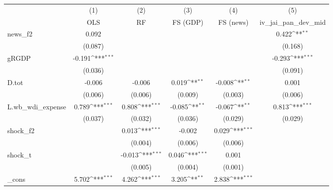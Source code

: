 {
\def\sym#1{\ifmmode^{#1}\else\(^{#1}\)\fi}
\begin{tabular}{l*{5}{c}}
\toprule
            &\multicolumn{1}{c}{(1)}&\multicolumn{1}{c}{(2)}&\multicolumn{1}{c}{(3)}&\multicolumn{1}{c}{(4)}&\multicolumn{1}{c}{(5)}\\
            &\multicolumn{1}{c}{OLS}&\multicolumn{1}{c}{RF}&\multicolumn{1}{c}{FS (GDP)}&\multicolumn{1}{c}{FS (news)}&\multicolumn{1}{c}{iv\_jai\_pan\_dev\_mid}\\
\midrule
news\_f2     &       0.092         &                     &                     &                     &       0.422\sym{**} \\
            &     (0.087)         &                     &                     &                     &     (0.168)         \\
\addlinespace
gRGDP       &      -0.191\sym{***}&                     &                     &                     &      -0.293\sym{***}\\
            &     (0.036)         &                     &                     &                     &     (0.091)         \\
\addlinespace
D.tot       &      -0.006         &      -0.006         &       0.019\sym{**} &      -0.008\sym{**} &       0.001         \\
            &     (0.006)         &     (0.006)         &     (0.009)         &     (0.003)         &     (0.006)         \\
\addlinespace
L.wb\_wdi\_expense&       0.789\sym{***}&       0.808\sym{***}&      -0.085\sym{**} &      -0.067\sym{**} &       0.813\sym{***}\\
            &     (0.037)         &     (0.032)         &     (0.036)         &     (0.029)         &     (0.029)         \\
\addlinespace
shock\_f2    &                     &       0.013\sym{***}&      -0.002         &       0.029\sym{***}&                     \\
            &                     &     (0.004)         &     (0.006)         &     (0.006)         &                     \\
\addlinespace
shock\_t     &                     &      -0.013\sym{***}&       0.046\sym{***}&       0.001         &                     \\
            &                     &     (0.005)         &     (0.004)         &     (0.001)         &                     \\
\addlinespace
\_cons      &       5.702\sym{***}&       4.262\sym{***}&       3.205\sym{**} &       2.838\sym{***}&                     \\

\end{tabular}}
